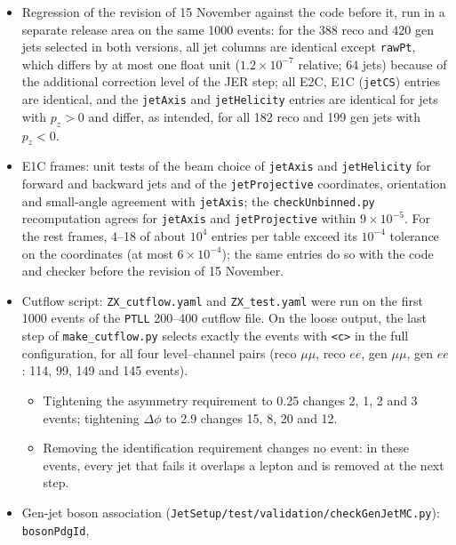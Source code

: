 \documentclass[11pt]{article}
\newcommand{\code}[1]{\texttt{#1}}
\begin{document}
\begin{itemize}
  hybrid formula to $1.3\times10^{-7}$. For the 56 unmatched jets the random numbers differ; the normalised shifts
  $(f-1)/(\sigma\sqrt{s^2-1})$ have mean $0.14$ and $-0.07$ and width $1.09$ and $1.04$ (ours and central), both
  compatible with a unit Gaussian within the statistical uncertainty. Scaling the scale factor by 1.02 in the check makes
  it fail.
\item Regression of the revision of 15 November against the code before it, run in a separate release area on the same 1000 events: for
  the 388 reco and 420 gen jets selected in both versions, all jet columns are identical except \code{rawPt}, which
  differs by at most one float unit ($1.2\times10^{-7}$ relative; 64 jets) because of the additional correction level
  of the JER step; all E2C, E1C (\code{jetCS}) entries are identical, and the \code{jetAxis} and \code{jetHelicity}
  entries are identical for jets with $p_z > 0$ and differ, as intended, for all 182 reco and 199 gen jets with
  $p_z < 0$.
\item E1C frames: unit tests of the beam choice of \code{jetAxis} and \code{jetHelicity} for forward and backward jets
  and of the \code{jetProjective} coordinates, orientation and small-angle agreement with \code{jetAxis}; the
  \code{checkUnbinned.py} recomputation agrees for \code{jetAxis} and \code{jetProjective} within $9\times10^{-5}$. For
  the rest frames, 4--18 of about $10^4$ entries per table exceed its $10^{-4}$ tolerance on the coordinates (at most
  $6\times10^{-4}$); the same entries do so with the code and checker before the revision of 15 November.
\item Cutflow script: \code{ZX\_cutflow.yaml} and \code{ZX\_test.yaml} were run on the first 1000 events of the
  \code{PTLL} 200--400 cutflow file. On the loose output, the last step of \code{make\_cutflow.py} selects exactly the
  events with \code{<c>} in the full configuration, for all four level--channel pairs (reco $\mu\mu$, reco $ee$,
  gen $\mu\mu$, gen $ee$: 114, 99, 149 and 145 events).
  \begin{itemize}
  \item Tightening the asymmetry requirement to 0.25 changes 2, 1, 2 and 3 events; tightening $\Delta\phi$ to 2.9
    changes 15, 8, 20 and 12.
  \item Removing the identification requirement changes no event: in these events, every jet that fails it overlaps a
    lepton and is removed at the next step.
  \end{itemize}
\item Gen-jet boson association (\code{JetSetup/\allowbreak{}test/\allowbreak{}validation/\allowbreak{}checkGenJetMC.py}): \code{bosonPdgId},

\end{itemize}
\end{document}
